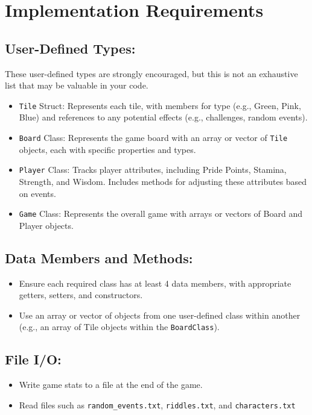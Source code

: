 \section{\textbf{Implementation Requirements}}

\subsection{User-Defined Types:}
These user-defined types are strongly encouraged, but this is not an exhaustive list that may be valuable in your code. 
\begin{itemize}

    \item \texttt{Tile} Struct: Represents each tile, with members for type (e.g., Green, Pink, Blue) and references to any potential effects (e.g., challenges, random events).
    \item \texttt{Board} Class: Represents the game board with an array or vector of \texttt{Tile} objects, each with specific properties and types.
    \item \texttt{Player} Class: Tracks player attributes, including Pride Points, Stamina, Strength, and Wisdom. Includes methods for adjusting these attributes based on events.
    \item \texttt{Game} Class: Represents the overall game with arrays or vectors of Board and Player objects.

\end{itemize}


\subsection{Data Members and Methods:}
\begin{itemize}
    \item Ensure each required class has at least 4 data members, with appropriate getters, setters, and constructors.
    \item Use an array or vector of objects from one user-defined class within another (e.g., an array of Tile objects within the \texttt{BoardClass}).
\end{itemize}


\subsection{File I/O:}
\begin{itemize}
    \item Write game stats to a file at the end of the game.
    \item Read files such as \verb|random_events.txt|, \verb|riddles.txt|, and \verb|characters.txt|
\end{itemize}


